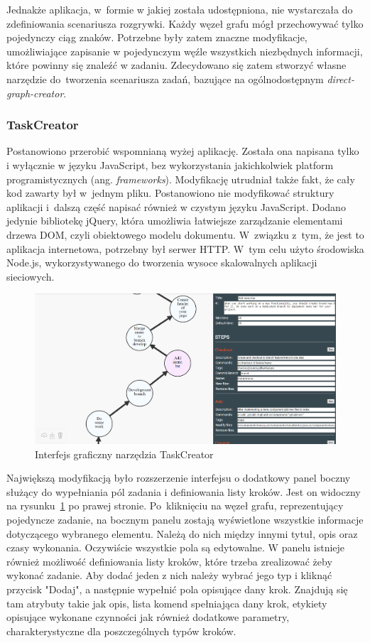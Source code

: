 \documentclass[11pt,a4paper,polish,thesis]{dcsbook}
\begin{document}
	Jednakże aplikacja, w~formie w jakiej została udostępniona, nie wystarczała do zdefiniowania scenariusza rozgrywki. Każdy węzeł grafu mógł przechowywać tylko pojedynczy ciąg znaków. Potrzebne były zatem znaczne modyfikacje, umożliwiające zapisanie w pojedynczym węźle wszystkich niezbędnych informacji, które powinny się znaleźć w zadaniu. Zdecydowano się zatem stworzyć własne narzędzie do~tworzenia scenariusza zadań, bazujące na ogólnodostępnym \textit{direct-graph-creator}.
	
	\subsubsection{TaskCreator}
	
	Postanowiono przerobić wspomnianą wyżej aplikację. Została ona napisana tylko i wyłącznie w języku JavaScript, bez wykorzystania jakichkolwiek platform programistycznych (ang. \textit{frameworks}). Modyfikację utrudniał także fakt, że cały kod zawarty był w~jednym pliku. Postanowiono nie modyfikować struktury aplikacji i~dalszą część napisać również w czystym języku JavaScript. Dodano jedynie bibliotekę jQuery, która umożliwia łatwiejsze zarządzanie elementami drzewa DOM, czyli obiektowego modelu dokumentu. W~związku z~tym, że jest to aplikacja internetowa, potrzebny był serwer HTTP. W~tym celu użyto środowiska Node.js, wykorzystywanego do tworzenia wysoce skalowalnych aplikacji sieciowych.
		
	\begin{figure}
		\centering
		\includegraphics[width=12cm]{graphCreator01}
		\caption{Interfejs graficzny narzędzia TaskCreator}
		\label{fig:taskCreator}
	\end{figure}
	
	Największą modyfikacją było rozszerzenie interfejsu o dodatkowy panel boczny służący do wypełniania pól zadania i definiowania listy kroków. Jest on widoczny na rysunku~\ref{fig:taskCreator} po prawej stronie. Po~kliknięciu na węzeł grafu, reprezentujący pojedyncze zadanie, na bocznym panelu zostają wyświetlone wszystkie informacje dotyczącego wybranego elementu. Należą do nich między innymi tytuł, opis oraz czasy wykonania. Oczywiście wszystkie pola są edytowalne. W panelu istnieje również możliwość definiowania listy kroków, które trzeba zrealizować żeby wykonać zadanie. Aby dodać jeden z nich należy wybrać jego typ i kliknąć przycisk "Dodaj", a następnie wypełnić pola opisujące dany krok. Znajdują się tam atrybuty takie jak opis, lista komend spełniająca dany krok, etykiety opisujące wykonane czynności jak również dodatkowe parametry, charakterystyczne dla poszczególnych typów kroków. 
	
\end{document}
